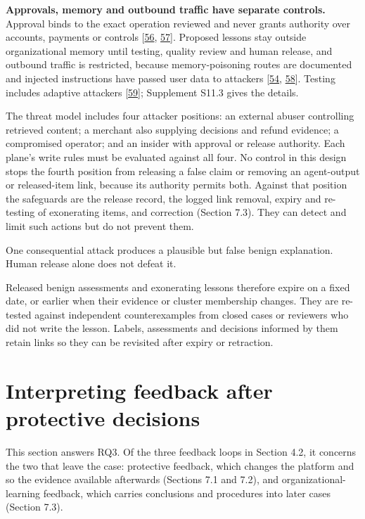 \documentclass[acmlarge,review,anonymous,nonacm]{acmart}
\begin{document}
\textbf{Approvals, memory and outbound traffic have separate controls.}
Approval binds to the exact operation reviewed and never grants
authority over accounts, payments or controls
{[}\protect\hyperlink{ref-Kumar2026}{56},
\protect\hyperlink{ref-InvariantLabs2025}{57}{]}. Proposed lessons stay
outside organizational memory until testing, quality review and human
release, and outbound traffic is restricted, because memory-poisoning
routes are documented and injected instructions have passed user data to
attackers {[}\protect\hyperlink{ref-Greshake2023}{54},
\protect\hyperlink{ref-Dash2026}{58}{]}. Testing includes adaptive
attackers {[}\protect\hyperlink{ref-Nasr2025}{59}{]}; Supplement S11.3
gives the details.

The threat model includes four attacker positions: an external abuser
controlling retrieved content; a merchant also supplying decisions and
refund evidence; a compromised operator; and an insider with approval or
release authority. Each plane's write rules must be evaluated against
all four. No control in this design stops the fourth position from
releasing a false claim or removing an agent-output or released-item
link, because its authority permits both. Against that position the
safeguards are the release record, the logged link removal, expiry and
re-testing of exonerating items, and correction (Section 7.3). They can
detect and limit such actions but do not prevent them.

One consequential attack produces a plausible but false benign
explanation. Human release alone does not defeat it.

Released benign assessments and exonerating lessons therefore expire on
a fixed date, or earlier when their evidence or cluster membership
changes. They are re-tested against independent counterexamples from
closed cases or reviewers who did not write the lesson. Labels,
assessments and decisions informed by them retain links so they can be
revisited after expiry or retraction.

\hypertarget{interpreting-feedback-after-protective-decisions}{%
\section{Interpreting feedback after protective
decisions}\label{interpreting-feedback-after-protective-decisions}}

This section answers RQ3. Of the three feedback loops in Section 4.2, it
concerns the two that leave the case: protective feedback, which changes
the platform and so the evidence available afterwards (Sections 7.1 and
7.2), and organizational-learning feedback, which carries conclusions
and procedures into later cases (Section 7.3).
\end{document}
